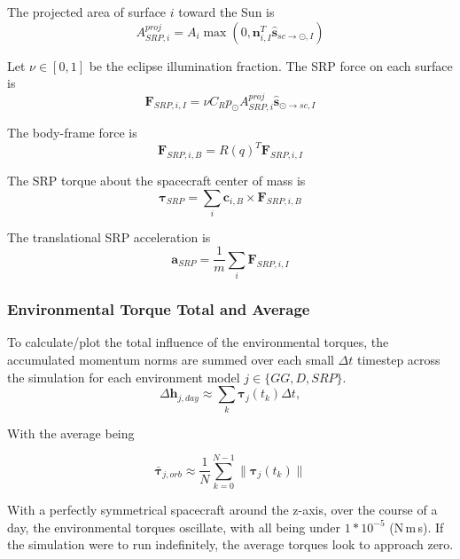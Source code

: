 \documentclass[conference,onecolumn,draftclsnofoot]{IEEEtran}
\begin{document}
The projected area of surface \(i\) toward the Sun is
\begin{equation}
A_{SRP,i}^{proj}
=
A_i
\max
\left(
0,
\mathbf n_{i,I}^T
\hat{\mathbf s}_{sc\rightarrow\odot,I}
\right)
\end{equation}

Let \(\nu\in[0,1]\) be the eclipse illumination fraction. The SRP force on each
surface is
\begin{equation}
\mathbf F_{SRP,i,I}
=
\nu
C_R
p_{\odot}
A_{SRP,i}^{proj}
\hat{\mathbf s}_{\odot\rightarrow sc,I}
\end{equation}

The body-frame force is
\begin{equation}
\mathbf F_{SRP,i,B}
=
R(q)^T
\mathbf F_{SRP,i,I}
\end{equation}

The SRP torque about the spacecraft center of mass is
\begin{equation}
\boldsymbol{\tau}_{SRP}
=
\sum_i
\mathbf c_{i,B}
\times
\mathbf F_{SRP,i,B}
\end{equation}

The translational SRP acceleration is
\begin{equation}
\mathbf a_{SRP}
=
\frac{1}{m}
\sum_i
\mathbf F_{SRP,i,I}
\end{equation}

\subsubsection{Environmental Torque Total and Average}

To calculate/plot the total influence of the environmental torques, the accumulated momentum norms are summed over each small $\Delta t$ timestep across the simulation for each environment model \(j\in\{GG,D,SRP\}\).
\begin{equation}
\Delta \mathbf h_{j,day}
\approx
\sum_k
\boldsymbol{\tau}_j(t_k)\Delta t,
\end{equation}

With the average being

\begin{equation}
\bar{\boldsymbol{\tau}}_{j,orb}
\approx
\frac{1}{N}
\sum_{k=0}^{N-1}
\|\boldsymbol{\tau}_j(t_k)\|
\end{equation}

With a perfectly symmetrical spacecraft around the z-axis, over the course of a day, the environmental torques oscillate, with all being under $1*10^{-5}$ (N\,m\,s). If the simulation were to run indefinitely, the average torques look to approach zero.
\end{document}
